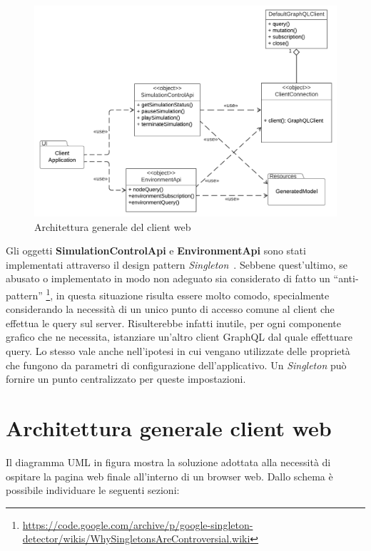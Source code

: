 \begin{figure}[htb]
	\centering
	\includegraphics[scale=0.5]{imgs/General_Architecture_Web_Client.pdf}
	\caption{Architettura generale del client web}
	\label{fig:general-client-architecture-graphics}
\end{figure}

Gli oggetti \textbf{SimulationControlApi} e \textbf{EnvironmentApi} sono stati implementati attraverso il design pattern \textit{Singleton}~\cite{Gamma1994}. Sebbene quest'ultimo, se abusato o implementato in modo non adeguato sia considerato di fatto un ``anti-pattern'' \footnote{\url{https://code.google.com/archive/p/google-singleton-detector/wikis/WhySingletonsAreControversial.wiki}}, in questa situazione risulta essere molto comodo, specialmente considerando la necessità di un unico punto di accesso comune al client che effettua le query sul server. Risulterebbe infatti inutile, per ogni componente grafico che ne necessita, istanziare un'altro client GraphQL dal quale effettuare query. Lo stesso vale anche nell'ipotesi in cui vengano utilizzate delle proprietà che fungono da parametri di configurazione dell'applicativo. Un \textit{Singleton} può fornire un punto centralizzato per queste impostazioni.

\section{Architettura generale client web}
Il diagramma UML in figura mostra la soluzione adottata alla necessità di ospitare la pagina web finale all'interno di un browser web. Dallo schema è possibile individuare le seguenti sezioni:


